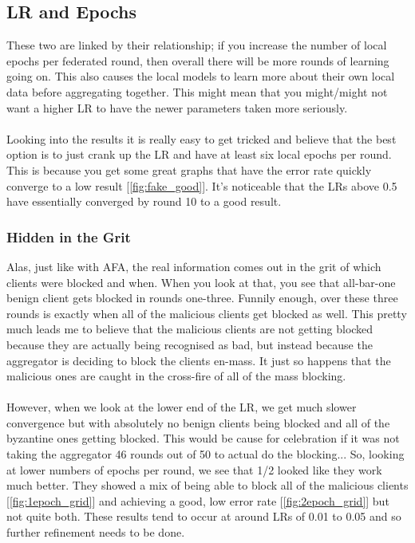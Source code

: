 \subsection{LR and Epochs}
These two are linked by their relationship; if you increase the number of local epochs per federated round, then overall there will be more rounds of learning going on. 
This also causes the local models to learn more about their own local data before aggregating together. 
This might mean that you might/might not want a higher LR to have the newer parameters taken more seriously.
\\ \\
Looking into the results it is really easy to get tricked and believe that the best option is to just crank up the LR and have at least six local epochs per round. 
This is because you get some great graphs that have the error rate quickly converge to a low result [\ref{fig:fake_good}].
It's noticeable that the LRs above 0.5 have essentially converged by round 10 to a good result.

\subsubsection{Hidden in the Grit}

Alas, just like with AFA, the real information comes out in the grit of which clients were blocked and when.
When you look at that, you see that all-bar-one benign client gets blocked in rounds one-three.
Funnily enough, over these three rounds is exactly when all of the malicious clients get blocked as well.
This pretty much leads me to believe that the malicious clients are not getting blocked because they are actually being recognised as bad, but instead because the aggregator is deciding to block the clients en-mass.
It just so happens that the malicious ones are caught in the cross-fire of all of the mass blocking.
\\ \\
However, when we look at the lower end of the LR, we get much slower convergence but with absolutely no benign clients being blocked and all of the byzantine ones getting blocked.
This would be cause for celebration if it was not taking the aggregator 46 rounds out of 50 to actual do the blocking...
So, looking at lower numbers of epochs per round, we see that 1/2 looked like they work much better.
They showed a mix of being able to block all of the malicious clients [\ref{fig:1epoch_grid}] and achieving a good, low error rate [\ref{fig:2epoch_grid}] but not quite both.
These results tend to occur at around LRs of 0.01 to 0.05 and so further refinement needs to be done.

